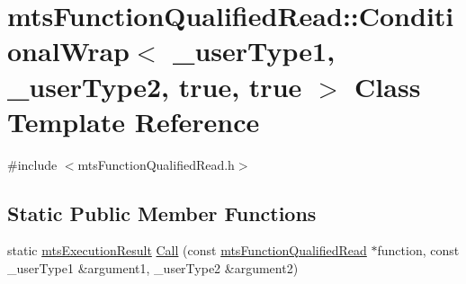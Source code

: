 \hypertarget{classmts_function_qualified_read_1_1_conditional_wrap_3_01__user_type1_00_01__user_type2_00_01true_00_01true_01_4}{\section{mts\-Function\-Qualified\-Read\-:\-:Conditional\-Wrap$<$ \-\_\-user\-Type1, \-\_\-user\-Type2, true, true $>$ Class Template Reference}
\label{classmts_function_qualified_read_1_1_conditional_wrap_3_01__user_type1_00_01__user_type2_00_01true_00_01true_01_4}
}


{\ttfamily \#include $<$mts\-Function\-Qualified\-Read.\-h$>$}

\subsection*{Static Public Member Functions}
\begin{DoxyCompactItemize}
\item 
static \hyperlink{classmts_execution_result}{mts\-Execution\-Result} \hyperlink{classmts_function_qualified_read_1_1_conditional_wrap_3_01__user_type1_00_01__user_type2_00_01true_00_01true_01_4_adb108f5a3fbe7002fe2f7c320361a184}{Call} (const \hyperlink{classmts_function_qualified_read}{mts\-Function\-Qualified\-Read} $\ast$function, const \-\_\-user\-Type1 \&argument1, \-\_\-user\-Type2 \&argument2)
\end{DoxyCompactItemize}


